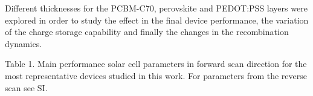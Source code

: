 

Different thicknesses for the PCBM-C70, perovskite and PEDOT:PSS layers were explored in order to study the effect in the final device performance, the variation of the charge storage capability and finally the changes in the recombination dynamics.

Table 1. Main performance solar cell parameters in forward scan direction for the most representative devices studied in this work. For parameters from the reverse scan see SI.

